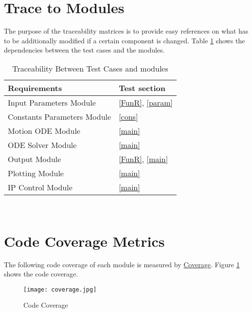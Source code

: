\documentclass[12pt, titlepage]{article}
\begin{document}
\section{Trace to Modules}		
The purpose of the traceability matrices is to provide easy references on what has to be additionally modified if a certain component is changed. Table \ref{Tbltracemodule} shows the dependencies between the test cases and the modules.
\begin{table}[ht]
	\centering
	\begin{tabular}{l l} 
		\toprule		
		\textbf{Requirements} & \textbf{Test section}\\
		\midrule 
		Input Parameters Module & \ref{FunR}, \ref{param} \\
		Constants Parameters Module & \ref{cons}\\
		Motion ODE Module & \ref{main}\\
            ODE Solver Module &\ref{main}\\
		Output Module &\ref{FunR}, \ref{main}\\
            Plotting Module &\ref{main} \\
            IP Control Module & \ref{main} \\
		\bottomrule
	\end{tabular}\\
	
	\caption{Traceability Between Test Cases and modules} 
	\label{Tbltracemodule}
\end{table}	

\section{Code Coverage Metrics}
The following code coverage of each module is measured by \href{https://coverage.readthedocs.io/en/7.2.3/}{Coverage}. Figure \ref{coverage} shows the code coverage.
\begin{figure}[H]
\begin{center}
\texttt{[image: coverage.jpg]}
 \caption{Code Coverage}
 \label{coverage}
 \end{center}
 \end{figure}


\end{document}
